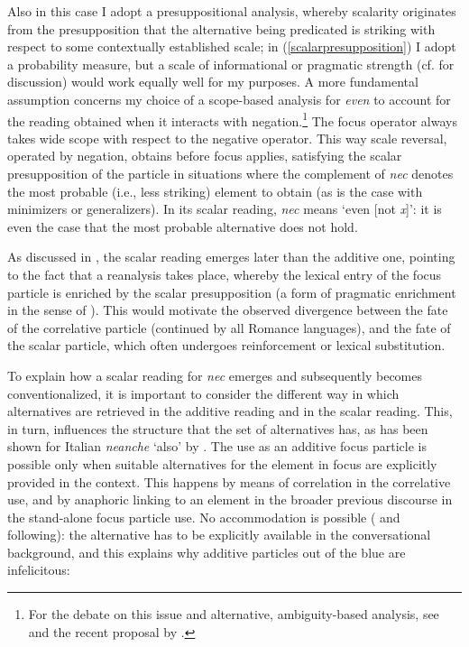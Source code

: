 \documentclass[output=paper,modfonts,nonflat,citecolor=brown,
showindex
]{langsci/langscibook}
\begin{document}
\noindent Also in this case I adopt a presuppositional analysis, whereby scalarity originates from the presupposition that the alternative being predicated is striking with respect to some contextually established scale; in (\ref{scalarpresupposition}) I adopt a probability measure, but a scale of informational or pragmatic strength (cf. \citealt{GastAuwera11} for discussion) would work equally well for my purposes. A more fundamental assumption concerns my choice of a scope-based analysis for {\emph{even}} to account for the reading obtained when it interacts with negation.{\footnote{For the debate on this issue and alternative, ambiguity-based analysis, see \citet[]{Rooth85} and the recent proposal by \citet[]{Collins16}.}} The focus operator always takes wide scope with respect to the negative operator. This way scale reversal, operated by negation, obtains before focus applies, satisfying the scalar presupposition of the particle in situations where the complement of {\emph{nec}} denotes the most probable (i.e., less striking) element to obtain (as is the case with minimizers or generalizers). In its scalar reading, {\emph{nec}} means `even [not {\emph{x}}]': it is even the case that the most probable alternative does not hold.

As discussed in , the scalar reading emerges later than the additive one, pointing to the fact that a reanalysis takes place, whereby the lexical entry of the focus particle is enriched by the scalar presupposition (a form of pragmatic enrichment in the sense of \citealt{TraugottDasher02}). This would motivate the observed divergence between the fate of the correlative particle (continued by all Romance languages), and the fate of the scalar particle, which often undergoes reinforcement or lexical substitution.

To explain how a scalar reading for {\emph{nec}} emerges and subsequently becomes conventionalized, it is important to consider the different way in which alternatives are retrieved in the additive reading and in the scalar reading. This, in turn, influences the structure that the set of alternatives has, as has been shown for Italian {\emph{neanche}} `also' by \citet{Tovena06}. The use as an additive focus particle is possible only when suitable alternatives for the element in focus are explicitly provided in the context. This happens by means of correlation in the correlative use, and by anaphoric linking to an element in the broader previous discourse in the stand-alone focus particle use. No accommodation is possible (\citealt[]{Zeevat92} and following): the alternative has to be explicitly available in the conversational background, and this explains why additive particles out of the blue are infelicitous:
\end{document}
